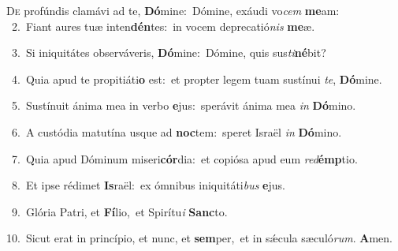 \lettrine{\initial\textcolor{\initialcolor}{D}}{e} profúndis clamávi ad te, \textbf{Dó}\-mine:~\star Dómine, exáudi vo\textit{cem} \textbf{me}\-am:\\
{\numbfont\textcolor{\numbcolor}{~2.}}~Fiant aures tuæ inten\-\textbf{dén}\-tes:~\star in vocem deprecatió\textit{nis} \textbf{me}\-æ.\par
{\numbfont\textcolor{\numbcolor}{~3.}}~Si iniquitátes observáveris, \textbf{Dó}\-mine:~\star Dómine, quis sus\-\textit{ti}\-\textbf{né}bit?\par
{\numbfont\textcolor{\numbcolor}{~4.}}~Quia apud te propitiáti\textbf{o} est:~\star et propter legem tuam sustínui \textit{te}\-, \textbf{Dó}\-mine.\par
{\numbfont\textcolor{\numbcolor}{~5.}}~Sustínuit ánima mea in verbo \textbf{e}\-jus:~\star sperávit ánima mea \textit{in} \textbf{Dó}\-mino.\par
{\numbfont\textcolor{\numbcolor}{~6.}}~A custódia matutína usque ad \textbf{noc}\-tem:~\star speret Israël \textit{in} \textbf{Dó}\-mino.\par
{\numbfont\textcolor{\numbcolor}{~7.}}~Quia apud Dóminum miseri\-\textbf{cór}\-dia:~\star et copiósa apud eum \textit{red}\-\textbf{émp}tio.\par
{\numbfont\textcolor{\numbcolor}{~8.}}~Et ipse rédimet \textbf{Is}\-raël:~\star ex ómnibus iniquitáti\textit{bus} \textbf{e}\-jus.\par
{\numbfont\textcolor{\numbcolor}{~9.}}~Glória Patri, et \textbf{Fí}\-lio,~\star et Spirítu\textit{i} \textbf{Sanc}\-to.\par
{\numbfont\textcolor{\numbcolor}{10.}}~Sicut erat in princípio, et nunc, et \textbf{sem}\-per,~\star et in sǽcula sæculó\-\textit{rum}\-. \textbf{A}\-men.\par
